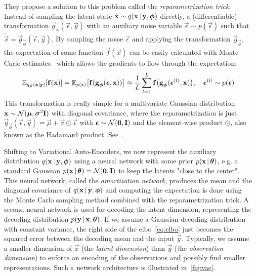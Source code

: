 	They propose a solution to this problem called the \emph{reparametrization trick}. Instead of sampling the latent state \( \tilde{\boldsymbol{\mathrm{x}}} \sim q(\boldsymbol{\mathrm{x}} \,\vert\, \boldsymbol{\mathrm{y}}, \boldsymbol{\mathrm{\phi}}) \) directly, a (differentiable) transformation \( \vec{g}_{\varphi}(\vec{\epsilon}, \vec{y}) \) with an auxiliary noise variable \(\vec{\epsilon} \sim p(\vec{\epsilon})\) such that \( \tilde{\vec{x}} = \vec{g}_{\vec{\phi}}(\vec{\epsilon}, \vec{y}) \). By sampling the noise \(\vec{\epsilon}\) and applying the transformation \(\vec{g}_{\vec{\phi}}\), the expectation of some function \( \vec{f}(\vec{x}) \) can be easily calculated with Monte Carlo estimates~\cite{kingmaAutoEncodingVariationalBayes2014} which allows the gradients to flow through the expectation:
	\begin{align*}
		\mathbb{E}_{q_{\boldsymbol{\mathrm{\phi}}}(\boldsymbol{\mathrm{x}} \vert \boldsymbol{\mathrm{y}})} [\boldsymbol{\mathrm{f}}(\boldsymbol{\mathrm{x}})]
			= \mathbb{E}_{p(\boldsymbol{\mathrm{\epsilon}})}\big[ \boldsymbol{\mathrm{f}}(\boldsymbol{\mathrm{g}}_{\boldsymbol{\mathrm{\phi}}}(\boldsymbol{\mathrm{\epsilon}}, \boldsymbol{\mathrm{x}})) \big]
			\approx \frac{1}{L} \sum_{l = 1}^{L} \boldsymbol{\mathrm{f}}\big(\boldsymbol{\mathrm{g}}_{\boldsymbol{\mathrm{\phi}}}(\boldsymbol{\mathrm{\epsilon}}^{(l)}, \boldsymbol{\mathrm{x}})\big),\quad \boldsymbol{\mathrm{\epsilon}}^{(l)} \sim p(\boldsymbol{\mathrm{\epsilon}})
	\end{align*}
	This transformation is really simple for a multivariate Gaussian distribution \( \boldsymbol{\mathrm{x}} \sim \mathcal{N}(\boldsymbol{\mathrm{\mu}}, \boldsymbol{\mathrm{\sigma}}^2 \boldsymbol{\mathrm{I}}) \) with diagonal covariance, where the reparametrization is just \( \vec{g}_{\vec{\phi}}(\vec{\epsilon}, \vec{y}) = \vec{\mu} + \vec{\sigma} \odot \vec{\epsilon} \) with \( \boldsymbol{\mathrm{\epsilon}} \sim \mathcal{N}(\boldsymbol{\mathrm{0}}, \boldsymbol{\mathrm{I}}) \) and the element-wise product \( \odot \), also known as the Hadamard product. See~\cite[5]{kingmaAutoEncodingVariationalBayes2014}.

	Shifting to Variational Auto-Encoders, we now represent the auxiliary distribution \( q(\boldsymbol{\mathrm{x}} \,\vert\, \boldsymbol{\mathrm{y}}, \boldsymbol{\mathrm{\phi}}) \) using a neural network with some prior \( p(\boldsymbol{\mathrm{x}} \,\vert\, \boldsymbol{\mathrm{\theta}}) \), e.g. a standard Gaussian \( p(\boldsymbol{\mathrm{x}} \,\vert\, \boldsymbol{\mathrm{\theta}}) = \mathcal{N}(\boldsymbol{\mathrm{0}}, \boldsymbol{\mathrm{I}}) \) to keep the latents "close to the center". This neural network, called the \emph{amortization network}, produces the mean and the diagonal covariance of \( q(\boldsymbol{\mathrm{x}} \,\vert\, \boldsymbol{\mathrm{y}}, \boldsymbol{\mathrm{\phi}}) \) and computing the expectation is done using the Monte Carlo sampling method combined with the reparametrization trick. A second neural network is used for decoding the latent dimension, representing the decoding distribution \( p(\boldsymbol{\mathrm{y}} \,\vert\, \boldsymbol{\mathrm{x}}, \boldsymbol{\mathrm{\theta}}) \). If we assume a Gaussian decoding distribution with constant variance, the right side of the \ac{elbo}~\eqref{eq:elbo} just becomes the squared error between the decoding mean and the input \(\vec{y}\). Typically, we assume a smaller dimension of \(\vec{x}\) (the \emph{latent dimension}) than \( \vec{y} \) (the \emph{observation dimension}) to enforce an encoding of the observations and possibly find smaller representations. Such a network architecture is illustrated in~\autoref{fig:vae}.

